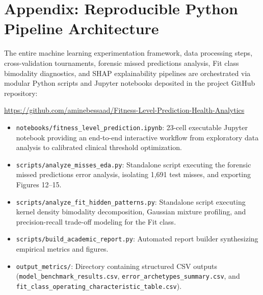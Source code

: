 \documentclass[11pt,a4paper]{article}
\begin{document}
\section*{Appendix: Reproducible Python Pipeline Architecture}

The entire machine learning experimentation framework, data processing steps, cross-validation tournaments, forensic missed predictions analysis, Fit class bimodality diagnostics, and SHAP explainability pipelines are orchestrated via modular Python scripts and Jupyter notebooks deposited in the project GitHub repository:
\begin{center}
\small\url{https://github.com/aminebessaad/Fitness-Level-Prediction-Health-Analytics}
\end{center}

\vspace{-4pt}
\begin{itemize}[leftmargin=*,itemsep=2pt]
    \item \texttt{notebooks/fitness\_level\_prediction.ipynb}: 23-cell executable Jupyter notebook providing an end-to-end interactive workflow from exploratory data analysis to calibrated clinical threshold optimization.
    \item \texttt{scripts/analyze\_misses\_eda.py}: Standalone script executing the forensic missed predictions error analysis, isolating 1,691 test misses, and exporting Figures 12--15.
    \item \texttt{scripts/analyze\_fit\_hidden\_patterns.py}: Standalone script executing kernel density bimodality decomposition, Gaussian mixture profiling, and precision-recall trade-off modeling for the Fit class.
    \item \texttt{scripts/build\_academic\_report.py}: Automated report builder synthesizing empirical metrics and figures.
    \item \texttt{output\_metrics/}: Directory containing structured CSV outputs (\texttt{model\_benchmark\_results.csv}, \texttt{error\_archetypes\_summary.csv}, and \texttt{fit\_class\_operating\_characteristic\_table.csv}).
\end{itemize}
\end{document}
